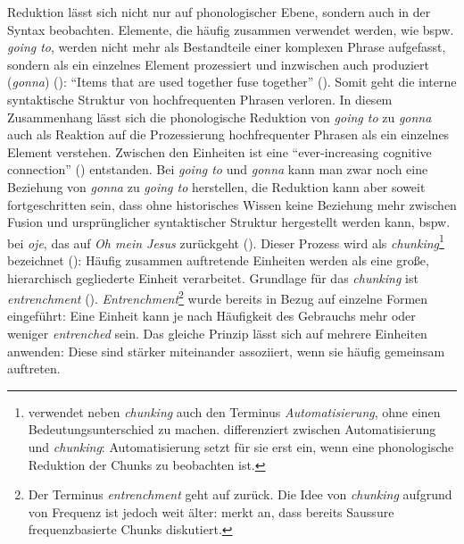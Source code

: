 Reduktion lässt sich nicht nur auf phonologischer Ebene, sondern auch in der Syntax beobachten. Elemente, die häufig zusammen verwendet werden, wie bspw. \textit{going to}, werden nicht mehr als Bestandteile einer komplexen Phrase aufgefasst, sondern als ein einzelnes Element prozessiert und inzwischen auch produziert (\textit{gonna}) (\cite[68--69]{BlumenthalDrame.2012}): "`Items that are used together fuse together"' (\cite[112]{Bybee.2002b}). Somit geht die interne syntaktische Struktur von hochfrequenten Phrasen verloren. In diesem Zusammenhang lässt sich die phonologische Reduktion von \textit{going to} zu \textit{gonna} auch als Reaktion auf die Prozessierung hochfrequenter Phrasen als ein einzelnes Element verstehen. Zwischen den Einheiten ist eine "`ever-increasing cognitive connection"' (\cite[13]{Schneider.2014}) entstanden. Bei \textit{going to} und \textit{gonna} kann man zwar noch eine Beziehung von \textit{gonna} zu \textit{going to} herstellen, die Reduktion kann aber soweit fortgeschritten sein, dass ohne historisches Wissen keine Beziehung mehr zwischen Fusion und ursprünglicher syntaktischer Struktur hergestellt werden kann, bspw. bei \textit{oje}, das auf \textit{Oh mein Jesus} zurückgeht (\cite{Nubling.2001}). Dieser Prozess wird als \textit{chunking}\footnote{\textcite[14--15]{Diessel.2017} verwendet neben \textit{chunking} auch den Terminus \textit{Automatisierung}, ohne einen Bedeutungsunterschied zu machen. \textcite[13]{Schneider.2014} differenziert zwischen Automatisierung und \textit{chunking}: Automatisierung setzt für sie erst ein, wenn eine phonologische Reduktion der Chunks zu beobachten ist.} bezeichnet (\cite[13]{Schneider.2014}): Häufig zusammen auftretende Einheiten werden als eine große, hierarchisch gegliederte Einheit verarbeitet. Grundlage für das \textit{chunking} ist \textit{entrenchment} (\cite[13]{Schneider.2014}). \textit{Entrenchment}\footnote{Der Terminus \textit{entrenchment} geht auf \textcite[59--60]{Langacker.1987} zurück. Die Idee von \textit{chunking} aufgrund von Frequenz ist jedoch weit älter: \textcite[11]{BlumenthalDrame.2012} merkt an, dass bereits Saussure frequenzbasierte Chunks diskutiert.} wurde bereits in Bezug auf einzelne Formen eingeführt: Eine Einheit kann je nach Häufigkeit des Gebrauchs mehr oder weniger \textit{entrenched} sein. Das gleiche Prinzip lässt sich auf mehrere Einheiten anwenden: Diese sind stärker miteinander assoziiert, wenn sie häufig gemeinsam auftreten. 



